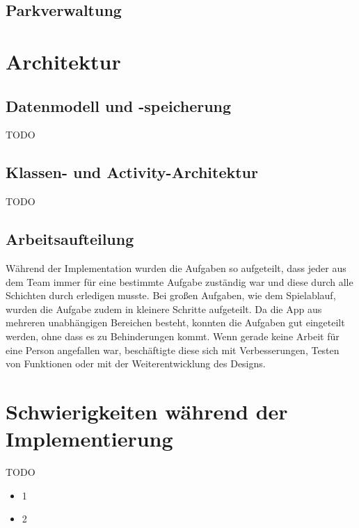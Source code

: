 
\subsection{Parkverwaltung}
\label{sec:implementierung:besonderheiten:parkverwaltung}



\section{Architektur}
\label{sec:implementierung:architektur}

\subsection{Datenmodell und -speicherung}
\label{sec:implementierung:architektur:datenmodell}

TODO

\subsection{Klassen- und Activity-Architektur}
\label{sec:implementierung:architektur:klassenmodell}

TODO

\subsection{Arbeitsaufteilung}
\label{sec:implementierung:architektur:arbeitsaufteilung}

Während der Implementation wurden die Aufgaben so aufgeteilt, dass jeder aus dem Team immer für eine bestimmte Aufgabe zuständig war und diese durch alle Schichten durch erledigen musste. Bei großen Aufgaben, wie dem Spielablauf, wurden die Aufgabe zudem in kleinere Schritte aufgeteilt. Da die App aus mehreren unabhängigen Bereichen besteht, konnten die Aufgaben gut eingeteilt werden, ohne dass es zu Behinderungen kommt. Wenn gerade keine Arbeit für eine Person angefallen war, beschäftigte diese sich mit Verbesserungen, Testen von Funktionen oder mit der Weiterentwicklung des Designs.

\section{Schwierigkeiten während der Implementierung}
\label{sec:implementierung:schwierigkeiten}	

TODO

\begin{itemize} 
\item 1
\item 2
\end{itemize}




